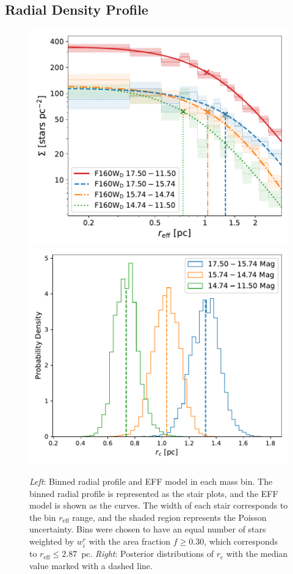 \documentclass[12pt]{ucsddissertation}
\newcommand{\reff}{r_\mathrm{eff}}
\begin{document}
\begin{CJK*}{UTF8}{gbsn}
\subsection{Radial Density Profile}
\label{wd1-subsec:radial_profile}

\begin{figure}[htb!]
\centering
\includegraphics[width = 0.496\linewidth]{figures/chapter2/Radial_Profile.pdf}
\includegraphics[width = 0.496\linewidth]{figures/chapter2/rc_distributions.pdf}
\caption[Binned radial profile and EFF model in each mass bin]{{\em Left}: Binned radial profile and EFF model in each mass bin. The binned radial profile is represented as the stair plots, and the EFF model is shown as the curves. The width of each stair corresponds to the bin $\reff$ range, and the shaded region represents the Poisson uncertainty. Bins were chosen to have an equal number of stars weighted by $w_i^r$ with the area fraction $f \geq 0.30$, which corresponds to $\reff \leq 2.87$~pc. {\em Right}: Posterior distributions of $r_c$ with the median value marked with a dashed line.}
\label{fig:mass_binned_radial_profile}
\end{figure}


\end{CJK*}
\end{document}

